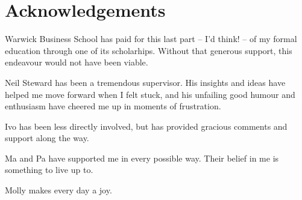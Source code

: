 
\chapter*{Acknowledgements}%
\label{cha:acknowledgements}


Warwick Business School has paid for this last part -- I'd think! --
of my formal education through one of its scholarhips. Without that generous
support, this endeavour would not have been viable.

Neil Steward has been a tremendous supervisor. His insights and ideas have
helped me move forward when I felt stuck, and his unfailing good humour and
enthusiasm have cheered me up in moments of frustration.

Ivo has been less directly involved, but has provided gracious comments and support along the way. 

Ma and Pa have supported me in every possible way. Their belief in me is
something to live up to.

Molly makes every day a joy.

